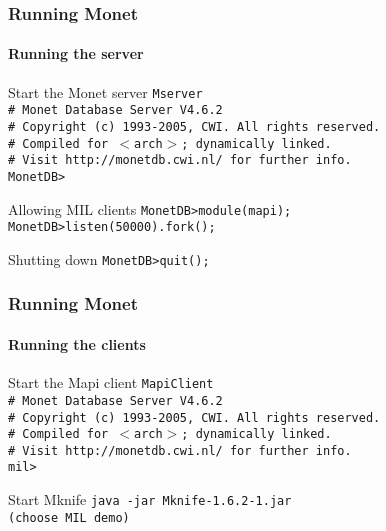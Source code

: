 \documentclass{beamer}
\begin{document}
\begin{frame}
  \frametitle{Running Monet}
  \framesubtitle{Running the server}

  \begin{block}{Start the Monet server}
  \alert{\tt Mserver} \\
  {\tt \# Monet Database Server V4.6.2} \\
  {\tt \# Copyright (c) 1993-2005, CWI. All rights reserved.} \\
  {\tt \# Compiled for $<$arch$>$; dynamically linked.} \\
  {\tt \# Visit http://monetdb.cwi.nl/ for further info.} \\
  {\tt MonetDB>}
  \end{block}

  \pause

  \begin{block}{Allowing MIL clients}
  {\tt MonetDB>module(mapi);} \\
  {\tt MonetDB>listen(50000).fork();}
  \end{block}

  \pause

  \begin{block}{Shutting down}
  {\tt MonetDB>quit();}
  \end{block}

\end{frame}

\begin{frame}
  \frametitle{Running Monet}
  \framesubtitle{Running the clients}

  \begin{block}{Start the Mapi client}
  \alert{\tt MapiClient} \\
  {\tt \# Monet Database Server V4.6.2} \\
  {\tt \# Copyright (c) 1993-2005, CWI. All rights reserved.} \\
  {\tt \# Compiled for $<$arch$>$; dynamically linked.} \\
  {\tt \# Visit http://monetdb.cwi.nl/ for further info.} \\
  {\tt mil>}
  \end{block}

  \pause

  \begin{block}{Start Mknife}
  \alert{\tt java -jar Mknife-1.6.2-1.jar} \\
  {\tt (choose MIL demo)}
  \end{block}

\end{frame}
\end{document}
